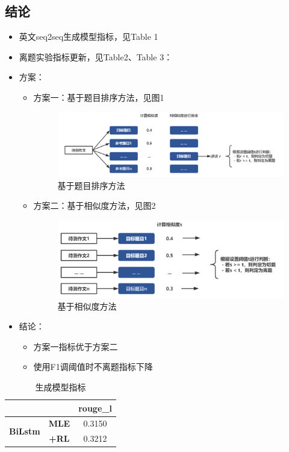\documentclass[11pt]{article}
\begin{document}
\begin{CJK}{UTF8}{gkai}
\section{结论}
\begin{itemize}
  \item 英文seq2seq生成模型指标，见Table 1
  \item 离题实验指标更新，见Table2、Table 3：
  \item 方案：
  \begin{itemize}
    \item 方案一：基于题目排序方法，见图1
    \begin{figure}[htbp]\small
      \centering
      \includegraphics[width=1.0\linewidth]{fa1.png}
      \caption{基于题目排序方法}
      \label{framework}
    \end{figure}
    \item 方案二：基于相似度方法，见图2
    \begin{figure}[htbp]\small
      \centering
      \includegraphics[width=1.0\linewidth]{fa2.png}
      \caption{基于相似度方法}
      \label{framework}
    \end{figure}
  \end{itemize}
  \item 结论：
  \begin{itemize}
    \item 方案一指标优于方案二
    \item 使用F1调阈值时不离题指标下降
  \end{itemize}
\end{itemize}



\begin{table}[htbp]
  \centering
  \begin{tabular}{c|c|c}
    \hline
    \multicolumn{2}{c|}{} & \textbf{rouge\_l} \\
    \hline
    \multirow{2}[0]{*}{\textbf{BiLstm}} & \textbf{MLE} & \multicolumn{1}{c}{0.3150 } \\
    \cline{2-3}
    & \textbf{+RL} & 0.3212  \\
    \hline
  \end{tabular}%
  \caption{生成模型指标}
  \label{tab:addlabel}%
\end{table}%


\end{CJK}
\end{document}
